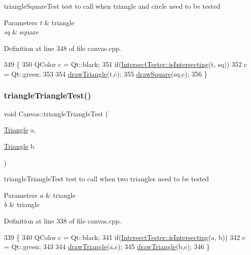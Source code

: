 triangle\+Square\+Test test to call when triangle and circle need to be tested 


\begin{DoxyParams}{Parameters}
{\em t} & triangle \\
\hline
{\em sq} & square \\
\hline
\end{DoxyParams}


Definition at line 348 of file canvas.\+cpp.


\begin{DoxyCode}
349 \{
350     QColor c = Qt::black;
351     \textcolor{keywordflow}{if}(\hyperlink{class_intersect_tester_a7710e17ff7d2e229059f23b9429213f5}{IntersectTester::isIntersecting}(t, sq))
352         c = Qt::green;
353 
354     \hyperlink{class_canvas_a74dd9cf1e8f3b48e2df2b34886770ac6}{drawTriangle}(t,c);
355     \hyperlink{class_canvas_a78ce810ea0004c4f3fa9ee9d92996875}{drawSquare}(sq,c);
356 \}
\end{DoxyCode}
\mbox{\label{class_canvas_a03c673b6f4e09524d322a8c00c5a49f2}} 
\subsubsection{\texorpdfstring{triangle\+Triangle\+Test()}{triangleTriangleTest()}}
{\footnotesize\ttfamily void Canvas\+::triangle\+Triangle\+Test (\begin{DoxyParamCaption}\item[{\hyperlink{class_triangle}{Triangle}}]{a,  }\item[{\hyperlink{class_triangle}{Triangle}}]{b }\end{DoxyParamCaption})\hspace{0.3cm}{\ttfamily [private]}}



triangle\+Triangle\+Test test to call when two triangles need to be tested 


\begin{DoxyParams}{Parameters}
{\em a} & triangle \\
\hline
{\em b} & triangle \\
\hline
\end{DoxyParams}


Definition at line 338 of file canvas.\+cpp.


\begin{DoxyCode}
339 \{
340     QColor c = Qt::black;
341     \textcolor{keywordflow}{if}(\hyperlink{class_intersect_tester_a7710e17ff7d2e229059f23b9429213f5}{IntersectTester::isIntersecting}(a, b))
342         c = Qt::green;
343 
344     \hyperlink{class_canvas_a74dd9cf1e8f3b48e2df2b34886770ac6}{drawTriangle}(a,c);
345     \hyperlink{class_canvas_a74dd9cf1e8f3b48e2df2b34886770ac6}{drawTriangle}(b,c);
346 \}
\end{DoxyCode}


